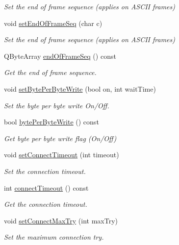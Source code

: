 \begin{DoxyCompactItemize}
\begin{DoxyCompactList}\small\item\em Set the end of frame sequence (applies on ASCII frames) \end{DoxyCompactList}\item 
void \hyperlink{classmdt_port_config_a9c67e95bb660a13313ec03e07a924793}{setEndOfFrameSeq} (char c)
\begin{DoxyCompactList}\small\item\em Set the end of frame sequence (applies on ASCII frames) \end{DoxyCompactList}\item 
QByteArray \hyperlink{classmdt_port_config_a9ac77f89ee4a0baadc4814a9a95701b6}{endOfFrameSeq} () const 
\begin{DoxyCompactList}\small\item\em Get the end of frame sequence. \end{DoxyCompactList}\item 
void \hyperlink{classmdt_port_config_ac6cb3d8fbefad9a832335c3f2023832c}{setBytePerByteWrite} (bool on, int waitTime)
\begin{DoxyCompactList}\small\item\em Set the byte per byte write On/Off. \end{DoxyCompactList}\item 
bool \hyperlink{classmdt_port_config_a9b5041ba740a5918e5e1323e61d3bbdc}{bytePerByteWrite} () const 
\begin{DoxyCompactList}\small\item\em Get byte per byte write flag (On/Off) \end{DoxyCompactList}\item 
void \hyperlink{classmdt_port_config_a64b8978cc32b97ffe64768fad6f2b0e8}{setConnectTimeout} (int timeout)
\begin{DoxyCompactList}\small\item\em Set the connection timeout. \end{DoxyCompactList}\item 
int \hyperlink{classmdt_port_config_a1e47b397318c6b4911d40dbbc5c317e7}{connectTimeout} () const 
\begin{DoxyCompactList}\small\item\em Get the connection timeout. \end{DoxyCompactList}\item 
void \hyperlink{classmdt_port_config_a1fed4cc77cc33193886e7562369eac88}{setConnectMaxTry} (int maxTry)
\begin{DoxyCompactList}\small\item\em Set the maximum connection try. \end{DoxyCompactList}\item 

\end{DoxyCompactItemize}
